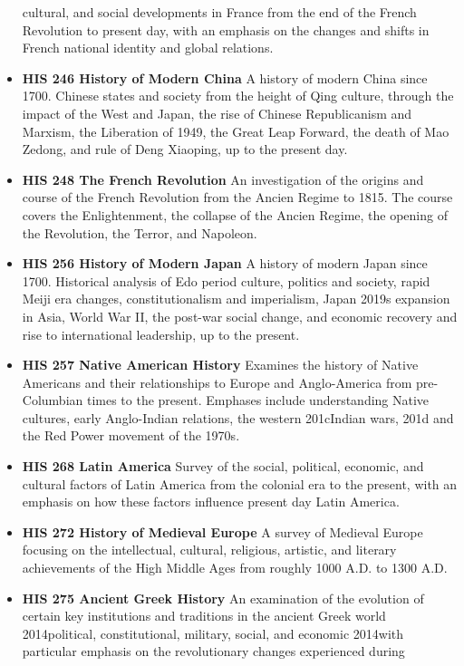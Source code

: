 \documentclass[
  letterpaper,
]{scrbook}
\begin{document}
\begin{itemize}
  cultural, and social developments in France from the end of the French
  Revolution to present day, with an emphasis on the changes and shifts
  in French national identity and global relations.
\item
  \textbf{HIS 246 History of Modern China} A history of modern China
  since 1700. Chinese states and society from the height of Qing
  culture, through the impact of the West and Japan, the rise of Chinese
  Republicanism and Marxism, the Liberation of 1949, the Great Leap
  Forward, the death of Mao Zedong, and rule of Deng Xiaoping, up to the
  present day.
\item
  \textbf{HIS 248 The French Revolution} An investigation of the origins
  and course of the French Revolution from the Ancien Regime to 1815.
  The course covers the Enlightenment, the collapse of the Ancien
  Regime, the opening of the Revolution, the Terror, and Napoleon.
\item
  \textbf{HIS 256 History of Modern Japan} A history of modern Japan
  since 1700. Historical analysis of Edo period culture, politics and
  society, rapid Meiji era changes, constitutionalism and imperialism,
  Japan 2019s expansion in Asia, World War II, the post-war social
  change, and economic recovery and rise to international leadership, up
  to the present.
\item
  \textbf{HIS 257 Native American History} Examines the history of
  Native Americans and their relationships to Europe and Anglo-America
  from pre- Columbian times to the present. Emphases include
  understanding Native cultures, early Anglo-Indian relations, the
  western 201cIndian wars, 201d and the Red Power movement of the 1970s.
\item
  \textbf{HIS 268 Latin America} Survey of the social, political,
  economic, and cultural factors of Latin America from the colonial era
  to the present, with an emphasis on how these factors influence
  present day Latin America.
\item
  \textbf{HIS 272 History of Medieval Europe} A survey of Medieval
  Europe focusing on the intellectual, cultural, religious, artistic,
  and literary achievements of the High Middle Ages from roughly 1000
  A.D. to 1300 A.D.
\item
  \textbf{HIS 275 Ancient Greek History} An examination of the evolution
  of certain key institutions and traditions in the ancient Greek world
  2014political, constitutional, military, social, and economic 2014with
  particular emphasis on the revolutionary changes experienced during

\end{itemize}
\end{document}
